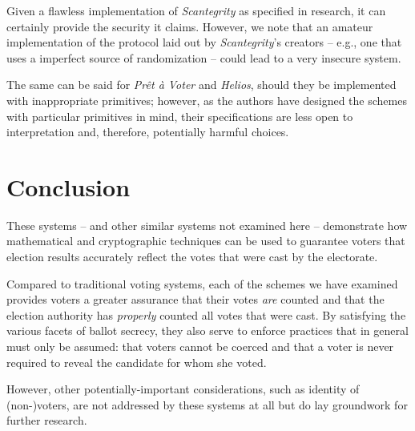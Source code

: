 \documentclass[10pt,twocolumn]{article}
\newcommand{\term}[1]{\textit{#1}}
\newcommand{\preta}{Pr\^{e}t \`{a}}
\newcommand{\pv}{\preta{} Voter}
\begin{document}
Given a flawless implementation of \term{Scantegrity} as specified in research, it can certainly provide the
security it claims. However, we note that an amateur implementation of the protocol laid out by
\term{Scantegrity}'s creators -- e.g., one that uses a imperfect source of randomization -- could lead to a
very insecure system.

The same can be said for \term{\pv{}} and \term{Helios}, should they be implemented with inappropriate primitives; however, as the authors have designed the schemes with particular primitives in mind, their
specifications are less open to interpretation and, therefore, potentially harmful choices.

\section{Conclusion}

These systems -- and other similar systems not examined here -- demonstrate how mathematical and
cryptographic techniques can be used to guarantee voters that election results accurately reflect
the votes that were cast by the electorate.

Compared to traditional voting systems, each of the schemes we have examined provides voters a
greater assurance that their votes \emph{are} counted and that the election authority has
\emph{properly} counted all votes that were cast. By satisfying the various facets of ballot
secrecy, they also serve to enforce practices that in general must only be assumed: that voters
cannot be coerced and that a voter is never required to reveal the candidate for whom she voted.

However, other potentially-important considerations, such as identity of (non-)voters, are not
addressed by these systems at all but do lay groundwork for further research.



\end{document}
